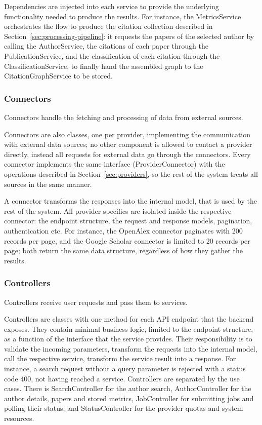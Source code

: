 Dependencies are injected into each service to provide the underlying functionality needed to produce the results.
For instance, the \textsf{MetricsService} orchestrates the flow to produce the citation collection described in Section~\ref{sec:processing-pipeline}: it requests the papers of the selected author by calling the \textsf{AuthorService}, the citations of each paper through the \textsf{PublicationService}, and the classification of each citation through the \textsf{ClassificationService}, to finally hand the assembled graph to the \textsf{CitationGraphService} to be stored.

\subsubsection{Connectors}

Connectors handle the fetching and processing of data from external sources.

Connectors are also classes, one per provider, implementing the communication with external data sources; no other component is allowed to contact a provider directly, instead all requests for external data go through the connectors.
Every connector implements the same interface (\textsf{ProviderConnector}) with the operations described in Section~\ref{sec:providers}, so the rest of the system treats all sources in the same manner.

A connector transforms the responses into the internal model, that is used by the rest of the system.
All provider specifics are isolated inside the respective connector: the endpoint structure, the request and response models, pagination, authentication etc.
For instance, the \textsf{OpenAlex} connector paginates with 200 records per page, and the \textsf{Google Scholar} connector is limited to 20 records per page; both return the same data structure, regardless of how they gather the results.

\subsubsection{Controllers}

Controllers receive user requests and pass them to services.

Controllers are classes with one method for each API endpoint that the backend exposes.
They contain minimal business logic, limited to the endpoint structure, as a function of the interface that the service provides.
Their responsibility is to validate the incoming parameters, transform the requests into the internal model, call the respective service, transform the service result into a response.
For instance, a search request without a query parameter is rejected with a status code \textsf{400}, not having reached a service.
Controllers are separated by the use cases.
There is \textsf{SearchController} for the author search, \textsf{AuthorController} for the author details, papers and stored metrics, \textsf{JobController} for submitting jobs and polling their status, and \textsf{StatusController} for the provider quotas and system resources.

